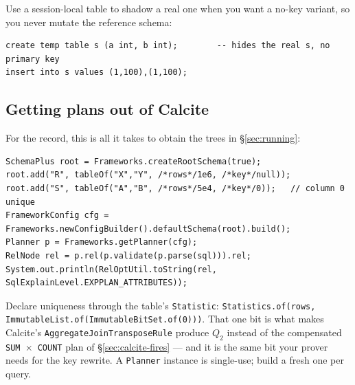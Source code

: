 Use a session-local table to shadow a real one when you want a no-key variant, so you never
mutate the reference schema:

\begin{lstlisting}[style=sql]
create temp table s (a int, b int);        -- hides the real s, no primary key
insert into s values (1,100),(1,100);
\end{lstlisting}

\subsection{Getting plans out of Calcite}

For the record, this is all it takes to obtain the trees in \S\ref{sec:running}:

\begin{lstlisting}[style=pseudo]
SchemaPlus root = Frameworks.createRootSchema(true);
root.add("R", tableOf("X","Y", /*rows*/1e6, /*key*/null));
root.add("S", tableOf("A","B", /*rows*/5e4, /*key*/0));   // column 0 unique
FrameworkConfig cfg = Frameworks.newConfigBuilder().defaultSchema(root).build();
Planner p = Frameworks.getPlanner(cfg);
RelNode rel = p.rel(p.validate(p.parse(sql))).rel;
System.out.println(RelOptUtil.toString(rel, SqlExplainLevel.EXPPLAN_ATTRIBUTES));
\end{lstlisting}

Declare uniqueness through the table's \texttt{Statistic}:
\lstinline[style=pseudo]|Statistics.of(rows, ImmutableList.of(ImmutableBitSet.of(0)))|.
That one bit is what makes Calcite's \texttt{AggregateJoinTransposeRule} produce $Q_2$
instead of the compensated \texttt{SUM $\times$ COUNT} plan of \S\ref{sec:calcite-fires} ---
and it is the same bit your prover needs for the key rewrite. A \texttt{Planner} instance is
single-use; build a fresh one per query.
